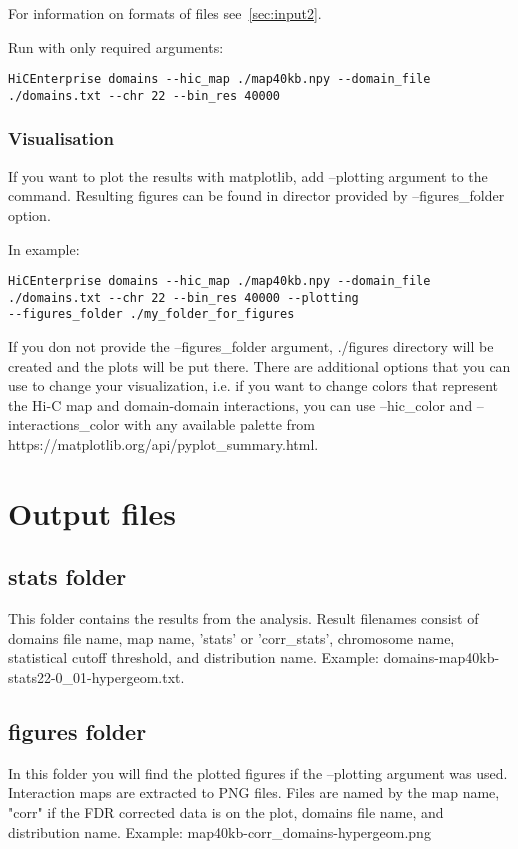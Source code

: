 For information on formats of files see~\ref{sec:input2}.

Run with only required arguments:
\begin{lstlisting}
HiCEnterprise domains --hic_map ./map40kb.npy --domain_file
./domains.txt --chr 22 --bin_res 40000
\end{lstlisting}


\subsubsection{Visualisation} 

If you want to plot the results with matplotlib, add --plotting argument to the command. Resulting figures can be found
in director provided by --figures\_folder option.

In example:
\begin{lstlisting}
HiCEnterprise domains --hic_map ./map40kb.npy --domain_file
./domains.txt --chr 22 --bin_res 40000 --plotting
--figures_folder ./my_folder_for_figures
\end{lstlisting}


If you don not provide the --figures\_folder argument, ./figures directory will be created and the plots will be put
there. There are additional options that you can use to change your visualization, i.e. if you want to change colors that
represent the Hi-C map and domain-domain interactions, you can use --hic\_color and --interactions\_color with any
available palette from https://matplotlib.org/api/pyplot\_summary.html.

\section{Output files}

\subsection{stats folder}
This folder contains the results from the analysis. Result filenames consist of domains file name, map name,
'stats' or 'corr\_stats', chromosome name, statistical cutoff threshold, and distribution name. Example:
domains-map40kb-stats22-0\_01-hypergeom.txt.

\subsection{figures folder}
In this folder you will find the plotted figures if the --plotting argument was used. Interaction maps are
extracted to PNG files. Files are named by the map name, "corr" if the FDR corrected data is on the plot, domains file
name, and distribution name. Example: map40kb-corr\_domains-hypergeom.png

